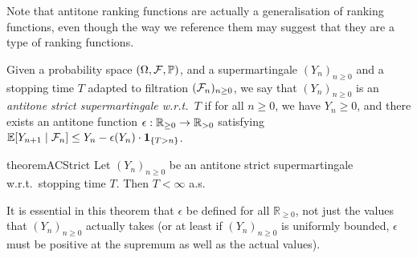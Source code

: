 Note that antitone ranking functions are actually a generalisation of ranking functions, even though the way we reference them may suggest that they are a type of ranking functions.

\iffalse
\lo{An aside: This CBV $\tY$-rule seems cleaner:
\[
\big(\tY f^{A \to B} \, x^A \, . \, \theta^B \big) \, v \to \theta[(\tY f \, x \, . \, \theta) / f, v / x].
\]
We assume $\tY f^{A \to B} \, x^A \, . \, \theta^B$ is a value.}
\fi

\begin{definition}
Given a probability space $(\Omega, \mathcal{F}, \mathbb{P})$, and a supermartingale $(Y_n)_{n \geq 0}$ and a stopping time $T$ adapted to filtration $(\mathcal{F}_n)_{n \geq 0}$,
we say that $(Y_n)_{n \geq 0}$ is an \emph{antitone strict supermartingale w.r.t.~$T$} if for all $n \geq 0$, we have $Y_n \geq 0$, and there exists an antitone function $\epsilon : \mathbb{R}_{{\geq}0} \to \mathbb{R}_{{>}0}$ satisfying
\(
\mathbb{E}[Y_{n+1} \mid \mathcal{F}_n] \leq Y_n - \epsilon (Y_n) \cdot {\bf 1}_{\{T > n\}}
\).
\end{definition}


\begin{restatable}{theorem}{ACStrict}
\label{thm:a-c strict}
Let $(Y_n)_{n \geq 0}$ be an antitone strict supermartingale w.r.t.~stopping time $T$. 
Then $T < \infty$ a.s.
\end{restatable}

It is essential in this theorem that $\epsilon$ be defined for all $\mathbb R_{\geq 0}$, not just the values that $(Y_n)_{n \geq 0}$ actually takes (or at least if $(Y_n)_{n \geq 0}$ is uniformly bounded, $\epsilon$ must be positive at the supremum as well as the actual values). 

